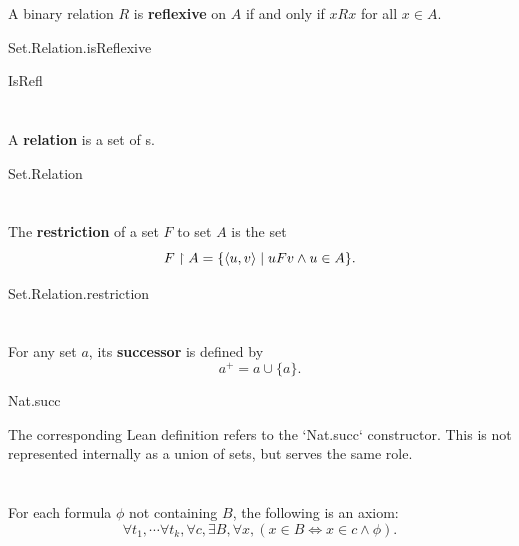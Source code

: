 \documentclass{report}
\begin{document}
  A binary relation $R$ is \textbf{reflexive} on $A$ if and only if $xRx$ for
    all $x \in A$.

    {Set.Relation.isReflexive}

    {IsRefl}

\section{}%

  A \textbf{relation} is a set of s.

    {Set.Relation}


\section{}%

  The \textbf{restriction} of a set $F$ to set $A$ is the set
    $$F \restriction A = \{\left< u, v \right> \mid uFv \land u \in A\}.$$

    {Set.Relation.restriction}

\section{}%

  For any set $a$, its \textbf{successor} is defined by $$a^+ = a \cup \{a\}.$$

    {Nat.succ}

  \begin{note}
    The corresponding Lean definition refers to the `Nat.succ` constructor.
    This is not represented internally as a union of sets, but serves the same
      role.
  \end{note}

\section{}%

  For each formula $\phi$ not containing $B$, the following is an axiom:
    $$\forall t_1, \cdots \forall t_k, \forall c,
        \exists B, \forall x, (x \in B \iff x \in c \land \phi).$$
\end{document}
